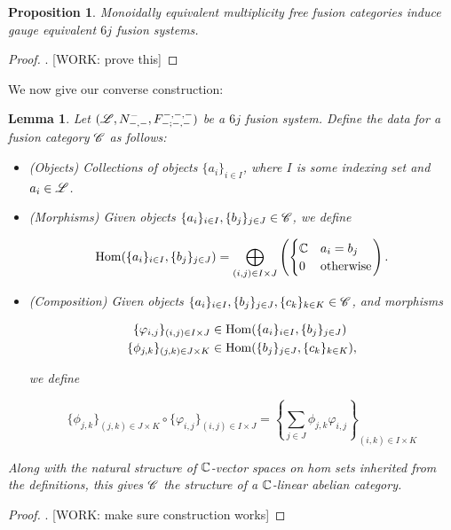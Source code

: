\documentclass{article}
\newtheorem{lemma}{Lemma}[section]
\newtheorem{proposition}{Proposition}[section]
\theoremstyle{definition}
\numberwithin{figure}{section}
\begin{document}
\begin{proposition} Monoidally equivalent multiplicity free fusion categories induce gauge equivalent $6j$ fusion systems.
\end{proposition}
\begin{proof}. [WORK: prove this]
\end{proof}

We now give our converse construction:

\begin{lemma} Let $(\mathscr{L},N_{\--,\--}^{\--},F^{\--,\--,\--}_{\--;\--,\--})$ be a $6j$ fusion system. Define the data for a fusion category $\mathscr{C}$ as follows:

\begin{itemize}
\item (Objects) Collections of objects $\{a_i\}_{i\in I}$, where $I$ is some indexing set and $a_i\in \mathscr{L}$.
\item (Morphisms) Given objects $\{a_{i}\}_{i\in I},\{b_j\}_{j\in J}\in \mathscr{C}$, we define

$$\mathrm{Hom}(\{a_{i}\}_{i\in I},\{b_j\}_{j\in J})=\bigoplus_{(i,j)\in I\times J}\left(\begin{cases} \mathbb{C} & a_i=b_j \\ 0 & \text{otherwise}\end{cases}\right).$$

\item (Composition) Given objects $\{a_{i}\}_{i\in I},\{b_j\}_{j\in J},\{c_k\}_{k\in K}\in \mathscr{C}$, and morphisms 

\begin{align*}
\{\varphi_{i,j}\}_{(i,j)\in I\times J}&\in \mathrm{Hom}(\{a_{i}\}_{i\in I},\{b_j\}_{j\in J})\\
\{\phi_{j,k}\}_{(j,k)\in J\times K}&\in \mathrm{Hom}(\{b_{j}\}_{j\in J},\{c_k\}_{k\in K}),
\end{align*}

we define

$$\{\phi_{j,k}\}_{(j,k)\in J\times K}\circ \{\varphi_{i,j}\}_{(i,j)\in I\times J}=\left\{\sum_{j\in J}\phi_{j,k}\varphi_{i,j}\right\}_{(i,k)\in I\times K}$$

\end{itemize}

Along with the natural structure of $\mathbb{C}$-vector spaces on hom sets inherited from the definitions, this gives $\mathscr{C}$ the structure of a $\mathbb{C}$-linear abelian category.
\end{lemma}
\begin{proof}. [WORK: make sure construction works]
\end{proof}
\end{document}
